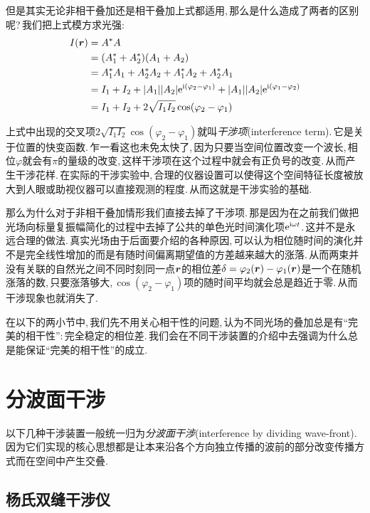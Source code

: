 但是其实无论非相干叠加还是相干叠加上式都适用,\,那么是什么造成了两者的区别呢?\,我们把上式模方求光强:
\begin{align*}
I(\boldsymbol{r}) &=A^\ast A \\
		  &=(A_1^\ast +A_2^\ast)(A_1+A_2) \\
		  &=A_1^\ast A_1+A_2^\ast A_2+ A_1^\ast A_2+A_2^\ast A_1 \\
		  &=I_1+I_2+ |A_1||A_2|{\rm e}^{{\rm i} (\varphi_2-\varphi_1)}+|A_1||A_2|{\rm e}^{{\rm i} (\varphi_1-\varphi_2)} \\
		  &=I_1+I_2+ 2\sqrt{I_1I_2}\cos (\varphi_2-\varphi_1)
\end{align*}

上式中出现的交叉项$2\sqrt{I_1I_2}\cos (\varphi_2-\varphi_1)$就叫\emph{干涉项}(interference term).\,它是关于位置的快变函数.\,乍一看这也未免太快了,\,因为只要当空间位置改变一个波长,\,相位$\varphi$就会有$\pi$的量级的改变,\,这样干涉项在这个过程中就会有正负号的改变.\,从而产生干涉花样.\,在实际的干涉实验中,\,合理的仪器设置可以使得这个空间特征长度被放大到人眼或助视仪器可以直接观测的程度.\,从而这就是干涉实验的基础.

那么为什么对于非相干叠加情形我们直接去掉了干涉项.\,那是因为在之前我们做把光场向标量复振幅简化的过程中去掉了公共的单色光时间演化项${\rm e} ^{{\rm i} \omega t}$.\,这并不是永远合理的做法.\,真实光场由于后面要介绍的各种原因,\,可以认为相位随时间的演化并不是完全线性增加的而是有随时间偏离期望值的方差越来越大的涨落.\,从而两束并没有关联的自然光之间不同时刻同一点$\boldsymbol{r}$的相位差$\delta=\varphi_2(\boldsymbol{r})-\varphi_1(\boldsymbol{r})$是一个在随机涨落的数,\,只要涨落够大,\,$\cos (\varphi_2-\varphi_1)$项的随时间平均就会总是趋近于零.\,从而干涉现象也就消失了.

在以下的两小节中,\,我们先不用关心相干性的问题,\,认为不同光场的叠加总是有``完美的相干性'':\,完全稳定的相位差.\,我们会在不同干涉装置的介绍中去强调为什么总是能保证``完美的相干性''的成立.




\section{分波面干涉}

以下几种干涉装置一般统一归为\emph{分波面干涉}(interference by dividing wave-front).\,因为它们实现的核心思想都是让本来沿各个方向独立传播的波前的部分改变传播方式而在空间中产生交叠.

\subsection{杨氏双缝干涉仪}


